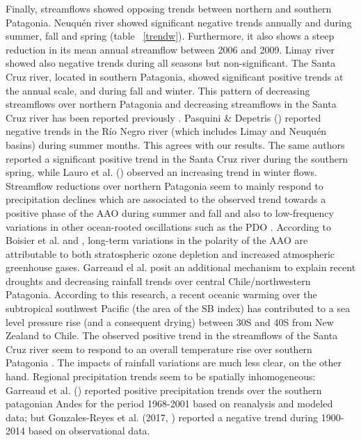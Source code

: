 \documentclass[AMA,Times1COL]{WileyNJDv5} %
\begin{document}
\begin{linenumbers}
Finally, streamflows showed opposing trends between northern and southern Patagonia. Neuquén river showed significant negative trends annually and during summer, fall and spring (table ~\ref{trendw}). Furthermore, it also shows a steep reduction in its mean annual streamflow between 2006 and 2009. Limay river showed also negative trends during all seasons but non-significant. The Santa Cruz river, located in southern Patagonia, showed significant positive trends at the annual scale, and during fall and winter. This pattern of decreasing streamflows over northern Patagonia and decreasing streamflows in the Santa Cruz river has been reported previously \cite{pasquini2011southern, rivera2018spatio}. Pasquini \& Depetris (\cite{pasquini2007discharge}) reported negative trends in the Río Negro river (which includes Limay and Neuquén basins) during summer months. This agrees with our results. The same authors reported a significant positive trend in the Santa Cruz river during the southern spring, while Lauro et al. (\cite{lauro2019streamflow}) observed an increasing trend in winter flows. Streamflow reductions over northern Patagonia seem to mainly respond to precipitation declines which are associated to the observed trend towards a positive phase of the AAO during summer and fall \cite{ aravena2009spatio, rivera2018spatio, fogt2020southern} and also to low-frequency variations in other ocean-rooted oscillations such as the PDO \cite{lauro2019streamflow}. According to Boisier et al. \cite{boisier2018anthropogenic} and \cite{villamayor2021causes}, long-term variations in the polarity of the AAO are attributable to both stratospheric ozone depletion and increased atmospheric greenhouse gases. Garreaud el al. \cite{garreaud2021south} posit an additional mechanism to explain recent droughts and decreasing rainfall trends over central Chile/northwestern Patagonia. According to this research, a recent oceanic warming over the subtropical southwest Pacific (the area of the SB index) has contributed to a sea level pressure rise (and a consequent drying) between 30\degree S and 40\degree S from New Zealand to Chile. The observed positive trend in the streamflows of the Santa Cruz river seem to respond to an overall temperature rise over southern Patagonia \cite{barros2015cambio, masiokas2015inventory,olivares2019warming}. The impacts of rainfall variations are much less clear, on the other hand. Regional precipitation trends seem to be spatially inhomogeneous: Garreaud et al. (\cite{garreaud2013large}) reported positive precipitation trends over the southern patagonian Andes for the period 1968-2001 based on reanalysis and modeled data; but Gonzales-Reyes et al. (2017, \cite{gonzalez2017variabilidad}) reported a negative trend during 1900-2014 based on observational data.


\end{linenumbers}
\end{document}
